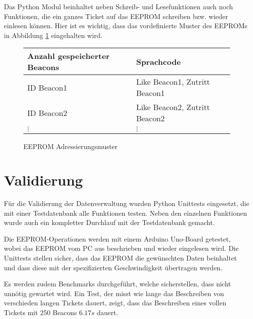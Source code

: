 Das Python Modul beinhaltet neben Schreib- und Lesefunktionen auch noch Funktionen, die ein ganzes Ticket auf das EEPROM schreiben bzw. wieder einlesen können.
Hier ist es wichtig, dass das vordefinierte Muster des EEPROMs in Abbildung \ref{eeprom_memory_pattern} eingehalten wird.


\begin{figure}
	\begin{tabular}{l|l}
		Anzahl gespeicherter Beacons & Sprachcode                      \\ \hline
		ID Beacon1                   & Like Beacon1, Zutritt Beacon1   \\ \hline
		ID Beacon2                   & Like Beacon2, Zutritt Beacon2   \\ \hline
		\(\vdots\)                   & \(\vdots\) 
	\end{tabular}
	\caption{EEPROM Adressierungsmuster}
	\label{eeprom_memory_pattern}
\end{figure}

\section{Validierung}
Für die Validierung der Datenverwaltung wurden Python Unittests eingesetzt, die mit einer Testdatenbank alle Funktionen testen.
Neben den einzelnen Funktionen wurde auch ein kompletter Durchlauf mit der Testdatenbank gemacht.

Die EEPROM-Operationen werden mit einem Arduino Uno-Board getestet, wobei das EEPROM vom PC aus beschrieben und wieder eingelesen wird.
Die Unittests stellen sicher, dass das EEPROM die gewünschten Daten beinhaltet und dass diese mit der spezifizierten Geschwindigkeit übertragen werden.

Es werden zudem Benchmarks durchgeführt, welche sicherstellen, dass nicht unnötig gewartet wird.
Ein Test, der misst wie lange das Beschreiben von verschieden langen Tickets dauert, zeigt, dass das Beschreiben eines vollen Tickets mit 250 Beacons $6.17s$ dauert.

